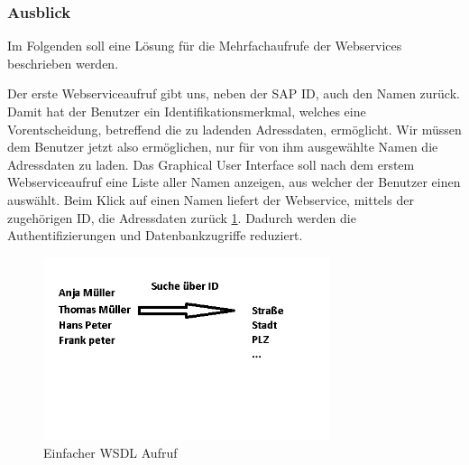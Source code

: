 \FloatBarrier
\subsubsection{Ausblick}

Im Folgenden soll eine Lösung für die Mehrfachaufrufe der Webservices beschrieben werden.

Der erste Webserviceaufruf gibt uns, neben der SAP ID, auch den Namen zurück. Damit hat der Benutzer ein Identifikationsmerkmal, 
welches eine Vorentscheidung, betreffend die zu ladenden Adressdaten, ermöglicht. Wir müssen dem Benutzer jetzt also ermöglichen, nur für 
von ihm ausgewählte Namen die Adressdaten zu laden. Das Graphical User Interface soll nach dem erstem Webserviceaufruf eine 
Liste aller Namen anzeigen, aus welcher der Benutzer einen auswählt. Beim Klick auf einen Namen liefert der Webservice, 
mittels der zugehörigen ID, die Adressdaten zurück \ref{fig:sapbild2}. Dadurch werden die Authentifizierungen und Datenbankzugriffe reduziert.

\begin{figure}[h!t]
\begin{center}
\includegraphics[width=0.75\textwidth]{Bilder/presi2.jpg}
\end{center}
\caption{Einfacher WSDL Aufruf}
\label{fig:sapbild2}
\end{figure}
\FloatBarrier